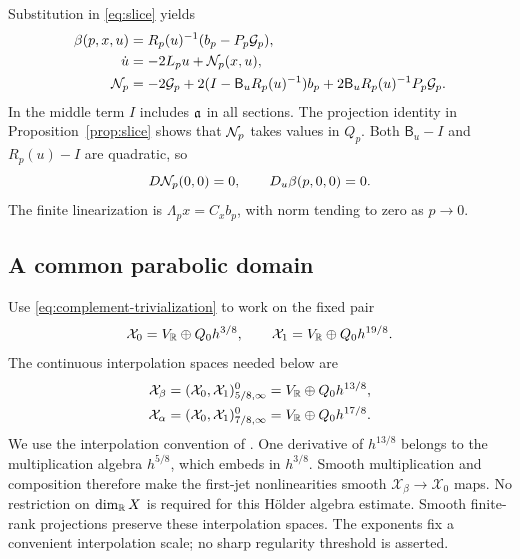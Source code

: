 Substitution in \eqref{eq:slice} yields
\begin{equation}\label{eq:normal-system}
 \begin{split}
 \beta(p,x,u)&=R_p(u)^{-1}(b_p-P_p\mathcal G_p),\\
 \dot u&=-2L_pu+\mathcal N_p(x,u),\\
 \mathcal N_p&=-2\mathcal G_p+
       2(I-\mathsf B_uR_p(u)^{-1})b_p
       +2\mathsf B_uR_p(u)^{-1}P_p\mathcal G_p .
 \end{split}
\end{equation}
In the middle term $I$ includes $\mathfrak a$ in all sections.
The projection identity in Proposition~\ref{prop:slice}
shows that $\mathcal N_p$ takes values in $Q_p$.
Both $\mathsf B_u-I$ and $R_p(u)-I$ are quadratic, so
\begin{equation}\label{eq:vanishing-jets}
 D\mathcal N_p(0,0)=0,\qquad D_u\beta(p,0,0)=0.
\end{equation}
The finite linearization is $\Lambda_px=C_xb_p$, with norm
tending to zero as $p\to0$.

\subsection{A common parabolic domain}
Use \eqref{eq:complement-trivialization} to work on the fixed pair
\[
 \mathcal X_0=V_{\mathbb R}\oplus Q_0h^{3/8},\qquad
 \mathcal X_1=V_{\mathbb R}\oplus Q_0h^{19/8}.
\]
The continuous interpolation spaces needed below are
\begin{equation}\label{eq:interpolation}
 \begin{split}
 \mathcal X_\beta
  &=(\mathcal X_0,\mathcal X_1)^0_{5/8,\infty}
        =V_{\mathbb R}\oplus Q_0h^{13/8},\\
 \mathcal X_\alpha
  &=(\mathcal X_0,\mathcal X_1)^0_{7/8,\infty}
        =V_{\mathbb R}\oplus Q_0h^{17/8}.
 \end{split}
\end{equation}
We use the interpolation convention of
\cite[Proposition~2.2(c)]{shaosimonett}. One derivative of
$h^{13/8}$ belongs to the multiplication algebra $h^{5/8}$,
which embeds in $h^{3/8}$. Smooth multiplication and composition
therefore make the first-jet nonlinearities smooth
$\mathcal X_\beta\to\mathcal X_0$ maps. No restriction on
$\dim_{\mathbb R}X$ is required for this H\"older algebra estimate.
Smooth finite-rank projections preserve these interpolation spaces.
The exponents fix a convenient interpolation scale; no sharp
regularity threshold is asserted.

